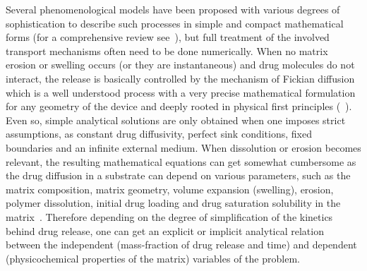 \documentclass[superbib,unsortedaddress,preprint,byrevtex,aps,noshowpacs,titlepage]{revtex4}
\begin{document}
Several phenomenological models have been proposed with various degrees of
sophistication to describe such processes in simple and compact mathematical forms 
(for a comprehensive review see~\cite{Costa2001}), but full treatment
of the involved transport mechanisms often need to be done numerically.
When no matrix erosion or swelling occurs (or they are instantaneous) and drug molecules do not
interact, the release is basically controlled by the mechanism of Fickian diffusion which is a well
 understood process with a very precise mathematical formulation for any geometry of the device 
and deeply rooted in physical first principles (~\cite{Crank1975}). 
Even so, simple analytical solutions are only obtained when one imposes strict assumptions, as 
constant drug diffusivity, perfect sink conditions, fixed boundaries
and an infinite external medium.
When dissolution or erosion becomes relevant, the resulting mathematical equations
can get somewhat cumbersome as the drug diffusion in a substrate can depend on various 
parameters, such as the matrix composition, matrix geometry, volume expansion 
(swelling), erosion, polymer dissolution, initial drug loading and drug saturation solubility 
in the matrix~\cite{Siepmann2001,Siepmann2001b}. 
Therefore depending on the degree of simplification of the kinetics behind drug release, one
can get an explicit or implicit analytical relation between the independent (mass-fraction 
of drug release and time) and dependent (physicochemical properties of the matrix) variables 
of the problem.
\end{document}
